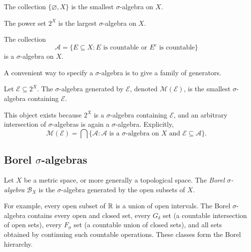 \begin{example}
  The collection $\{\varnothing,X\}$ is the smallest $\sigma$-algebra on
  $X$.
\end{example}

\begin{example}
  The power set $2^X$ is the largest $\sigma$-algebra on $X$.
\end{example}

\begin{example}
  The collection
  \[
    \mathcal A
    =\{E\subseteq X:E\text{ is countable or }E^c\text{ is countable}\}
  \]
  is a $\sigma$-algebra on $X$.
\end{example}

A convenient way to specify a $\sigma$-algebra is to give a family of
generators.

\begin{definition}
  Let $\mathcal E\subseteq 2^X$. The $\sigma$-algebra generated by
  $\mathcal E$, denoted $\mathcal M(\mathcal E)$, is the smallest
  $\sigma$-algebra containing $\mathcal E$.
\end{definition}

This object exists because $2^X$ is a $\sigma$-algebra containing
$\mathcal E$, and an arbitrary intersection of $\sigma$-algebras is again
a $\sigma$-algebra. Explicitly,
\[
  \mathcal M(\mathcal E)
  =\bigcap\{\mathcal A:\mathcal A\text{ is a $\sigma$-algebra on $X$ and }
    \mathcal E\subseteq\mathcal A\}.
\]

\subsection{Borel \texorpdfstring{$\sigma$}{sigma}-algebras}

\begin{definition}
  Let $X$ be a metric space, or more generally a topological space. The
  \emph{Borel $\sigma$-algebra} $\mathcal B_X$ is the $\sigma$-algebra
  generated by the open subsets of $X$.
\end{definition}

For example, every open subset of $\mathbb{R}$ is a union of open intervals.
The Borel $\sigma$-algebra contains every open and closed set, every
$G_\delta$ set (a countable intersection of open sets), every $F_\sigma$
set (a countable union of closed sets), and all sets obtained by continuing
such countable operations. These classes form the Borel hierarchy.

